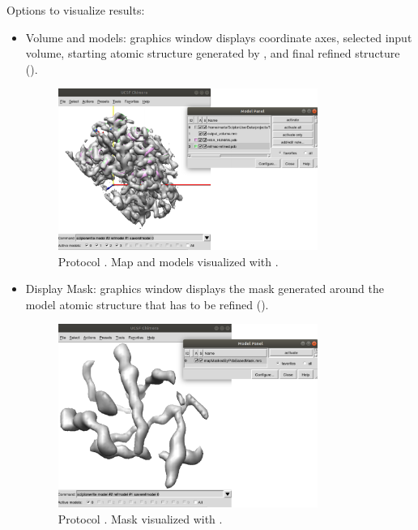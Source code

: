 \begin{itemize}
    Options to visualize  results:
    \begin{itemize}
     \item Volume and models:
     \chimera graphics window displays coordinate axes, selected input volume, starting atomic structure generated by \coot, and final  refined structure ().
        \begin{figure}[H]
         \centering 
         \captionsetup{width=.7\linewidth} 
         \includegraphics[width=0.80\textwidth]{Images_appendix/Fig128.pdf}
         \caption{Protocol . Map and models visualized with \chimera.}
         \label{fig:app_protocol_refmac_3}
        \end{figure}
     \item Display Mask:
     \chimera graphics window displays the mask generated around the model atomic structure that has to be refined ().
        \begin{figure}[H]
         \centering 
         \captionsetup{width=.7\linewidth} 
         \includegraphics[width=0.80\textwidth]{Images_appendix/Fig129.pdf}
         \caption{Protocol . Mask visualized with \chimera.}

\end{figure}
\end{itemize}
\end{itemize}
